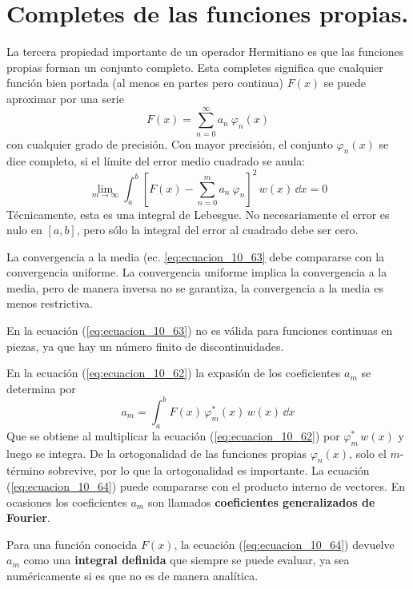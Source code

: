 \section{Completes de las funciones propias.}
La tercera propiedad importante de un operador Hermitiano es que las funciones propias forman un conjunto completo. Esta completes significa que cualquier función bien portada (al menos en partes pero continua) $F(x)$ se puede aproximar por una serie
\begin{equation}
F(x) = \sum_{n=0}^{\infty} a_{n} \: \varphi_{n}(x) 
\label{eq:ecuacion_10_62}
\end{equation}
con cualquier grado de precisión. Con mayor precisión, el conjunto $\varphi_{n} (x)$ se dice completo, si el límite del error medio cuadrado se anula:
\begin{equation}
\lim_{m \to \infty} \int_{a}^{b} \left[ F(x) - \sum_{n=0}^{m} a_{n} \: \varphi_{n} \right]^{2} \, w(x) \, \dd x = 0
\label{eq:ecuacion_10_63}
\end{equation}
Técnicamente, esta es una integral de Lebesgue. No necesariamente el error es nulo en $[a,b]$, pero sólo la integral del error al cuadrado debe ser cero.
\par
La convergencia a la media (ec. \ref{eq:ecuacion_10_63} debe compararse con la convergencia uniforme. La convergencia uniforme implica la convergencia a la media, pero de manera inversa no se garantiza, la convergencia a la media es menos restrictiva.
\par
En la ecuación (\ref{eq:ecuacion_10_63}) no es válida para funciones continuas en piezas, ya que hay un número finito de discontinuidades.
\par
 En la ecuación (\ref{eq:ecuacion_10_62}) la expasión de los coeficientes $a_{m}$ se determina por
\begin{equation}
a_{m} = \int_{a}^{b} F(x) \, \varphi_{m}^{*} (x) \, w(x) \, \dd x
\label{eq:ecuacion_10_64}
\end{equation}
Que se obtiene al multiplicar la ecuación (\ref{eq:ecuacion_10_62}) por $\varphi_{m}^{*} \, w(x)$ y luego se integra. De la ortogonalidad de las funciones propias $\varphi_{n}(x)$, solo el $m$-término sobrevive, por lo que la ortogonalidad es importante. La ecuación (\ref{eq:ecuacion_10_64}) puede compararse con el producto interno de vectores. En ocasiones los coeficientes $a_{m}$ son llamados \textbf{coeficientes generalizados de Fourier}.
\par
Para una función conocida $F(x)$, la ecuación (\ref{eq:ecuacion_10_64}) devuelve $a_{m}$ como una \textbf{integral definida} que siempre se puede evaluar, ya sea numéricamente si es que no es de manera analítica.
